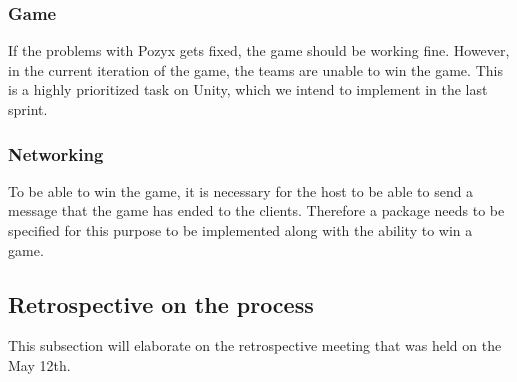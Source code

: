\subsubsection{Game}
If the problems with Pozyx gets fixed, the game should be working fine.
However, in the current iteration of the game, the teams are unable to win the game.
This is a highly prioritized task on Unity, which we intend to implement in the last sprint.

\subsubsection{Networking}
To be able to win the game, it is necessary for the host to be able to send a message that the game has ended to the clients.
Therefore a package needs to be specified for this purpose to be implemented along with the ability to win a game.

\subsection{Retrospective on the process}
This subsection will elaborate on the retrospective meeting that was held on the May 12th.


